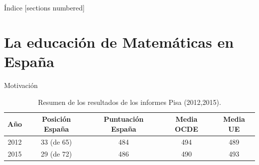 \documentclass[10pt,notes,compress,usetitleprogressbar,aspectratio=1610]{beamer}
\title{\titulo}
\subtitle{\TFM}
\author{Víctor de Juan Sanz}
\date{Julio 2017}
\institute{}
\begin{document}
\maketitle

\begin{frame}{Índice}
	[sections numbered]
	\tableofcontents[hideallsubsections]
\end{frame}


\section{La educación de Matemáticas en España}
\note{}


\begin{frame}{Motivación}
	\note{}
		\begin{table}[hbtp]
		\centering
		\caption{Resumen de los resultados de los informes Pisa (2012,2015).}
		\label{tbl::ResumenPisa}
		\begin{tabular}{c|cccc}
		Año & Posición España & Puntuación España & Media OCDE & Media UE\\\hline
		2012 & 33 (de 65) & 484 & 494 & 489\\
		2015 & 29 (de 72) & 486 & 490 & 493
		\end{tabular}
		\vspace{0.3cm}

		\end{table}

\end{frame}
\end{document}
